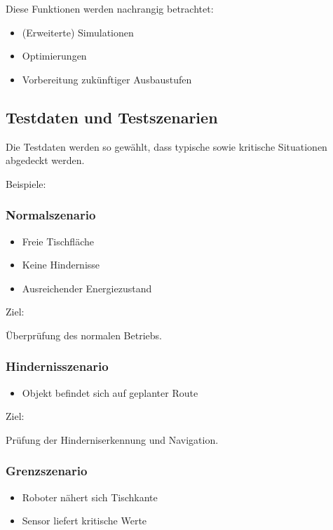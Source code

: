 Diese Funktionen werden nachrangig betrachtet:

\begin{itemize}
\tightlist
\item
  (Erweiterte) Simulationen
\item
  Optimierungen
\item
  Vorbereitung zukünftiger Ausbaustufen
\end{itemize}

\subsection{Testdaten und
Testszenarien}\label{testdaten-und-testszenarien}

Die Testdaten werden so gewählt, dass typische sowie kritische
Situationen abgedeckt werden.

Beispiele:

\subsubsection{Normalszenario}\label{normalszenario}

\begin{itemize}
\tightlist
\item
  Freie Tischfläche
\item
  Keine Hindernisse
\item
  Ausreichender Energiezustand
\end{itemize}

Ziel:

Überprüfung des normalen Betriebs.

\subsubsection{Hindernisszenario}\label{hindernisszenario}

\begin{itemize}
\tightlist
\item
  Objekt befindet sich auf geplanter Route
\end{itemize}

Ziel:

Prüfung der Hinderniserkennung und Navigation.

\subsubsection{Grenzszenario}\label{grenzszenario}

\begin{itemize}
\tightlist
\item
  Roboter nähert sich Tischkante
\item
  Sensor liefert kritische Werte
\end{itemize}

